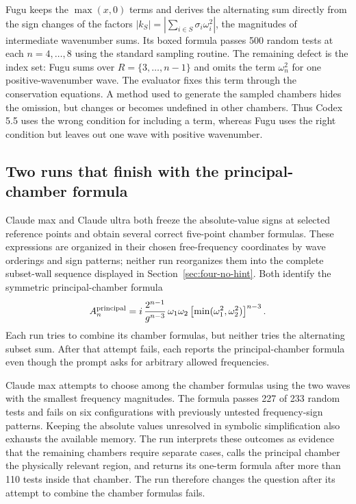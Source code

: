 \documentclass{article}
\begin{document}
Fugu keeps the $\max(x,0)$ terms and derives the alternating sum directly from
the sign changes of the factors
$|k_S|=|\sum_{i\in S}\sigma_i\omega_i^2|$, the magnitudes of intermediate
wavenumber sums. Its boxed formula passes 500 random tests at each
$n=4,\ldots,8$ using the standard sampling routine. The remaining defect is
the index set: Fugu sums over $R=\{3,\ldots,n-1\}$ and omits the term
$\omega_n^2$ for one positive-wavenumber wave. The evaluator fixes this term
through the conservation equations. A
method used to generate the sampled chambers hides the omission, but changes
or becomes undefined in other chambers. Thus Codex 5.5 uses the wrong condition
for including a term, whereas Fugu uses the right condition but leaves out one
wave with positive wavenumber.

\subsection{Two runs that finish with the principal-chamber formula}

Claude max and Claude ultra both freeze the absolute-value signs at selected
reference points and obtain several correct five-point chamber formulas.
These expressions are organized in their chosen free-frequency coordinates by
wave orderings and sign patterns; neither run reorganizes them into the complete
subset-wall sequence displayed in Section~\ref{sec:four-no-hint}. Both identify the symmetric principal-chamber
formula
\[
A_n^{\rm principal}
=
i\,\frac{2^{n-1}}{g^{n-3}}\,
\omega_1\omega_2
\left[\min(\omega_1^2,\omega_2^2)\right]^{n-3}.
\]
Each run tries to combine its chamber formulas, but neither tries the
alternating subset sum. After that attempt fails, each reports the
principal-chamber formula even though the prompt asks for arbitrary allowed
frequencies.

Claude max attempts to choose among the chamber formulas using the two waves
with the smallest frequency magnitudes. The formula passes 227 of 233 random tests and fails
on six configurations with previously untested frequency-sign patterns.
Keeping the absolute values unresolved in symbolic simplification also
exhausts the available memory. The run interprets these outcomes as evidence
that the remaining chambers require separate cases, calls the principal
chamber the physically relevant region, and returns its one-term formula after more
than 110 tests inside that chamber. The run therefore changes the question
after its attempt to combine the chamber formulas fails.
\end{document}
